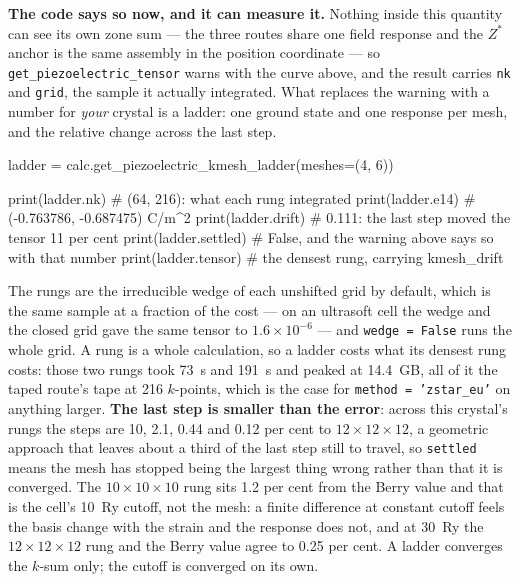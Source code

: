 \documentclass[11pt,a4paper]{article}
\newcommand{\code}[1]{\texttt{\small #1}}
\begin{document}
\textbf{The code says so now, and it can measure it.} Nothing inside this
quantity can see its own zone sum --- the three routes share one field response
and the $Z^\ast$ anchor is the same assembly in the position coordinate --- so
\code{get\_piezoelectric\_tensor} warns with the curve above, and the result
carries \code{nk} and \code{grid}, the sample it actually integrated. What
replaces the warning with a number for \emph{your} crystal is a ladder: one
ground state and one response per mesh, and the relative change across the last
step.

\begin{pycode}
ladder = calc.get_piezoelectric_kmesh_ladder(meshes=(4, 6))

print(ladder.nk)       # (64, 216): what each rung integrated
print(ladder.e14)      # (-0.763786, -0.687475) C/m^2
print(ladder.drift)    # 0.111: the last step moved the tensor 11 per cent
print(ladder.settled)  # False, and the warning above says so with that number
print(ladder.tensor)   # the densest rung, carrying kmesh_drift
\end{pycode}

The rungs are the irreducible wedge of each unshifted grid by default, which is
the same sample at a fraction of the cost --- on an ultrasoft cell the wedge and
the closed grid gave the same tensor to $1.6\times10^{-6}$ --- and
\code{wedge = False} runs the whole grid. A rung is a whole calculation, so a
ladder costs what its densest rung costs: those two rungs took 73~s and 191~s
and peaked at 14.4~GB, all of it the taped route's tape at 216 $k$-points, which
is the case for \code{method = 'zstar\_eu'} on anything larger.
\textbf{The last step is smaller than
the error}: across this crystal's rungs the steps are 10, 2.1, 0.44 and 0.12 per
cent to $12\times12\times12$, a geometric approach that leaves about a third of
the last step still to travel, so \code{settled} means the mesh has stopped
being the largest thing wrong rather than that it is converged. The
$10\times10\times10$ rung sits 1.2 per cent from the Berry value and that is
the cell's 10~Ry cutoff, not the mesh: a finite difference at constant cutoff
feels the basis change with the strain and the response does not, and at 30~Ry
the $12\times12\times12$ rung and the Berry value agree to 0.25 per cent. A
ladder converges the $k$-sum only; the cutoff is converged on its own.
\end{document}
